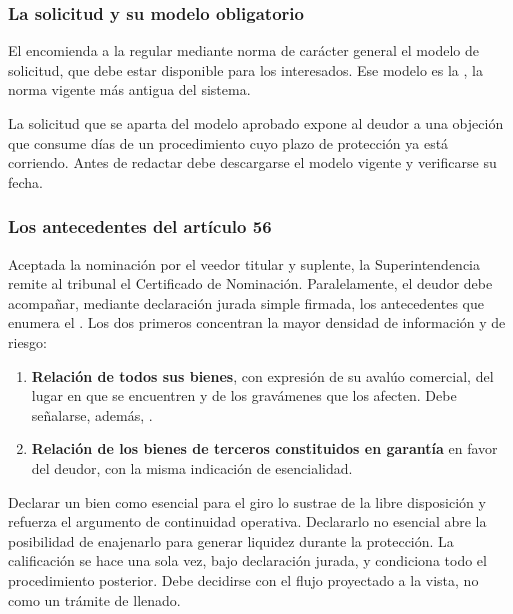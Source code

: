 \subsubsection{La solicitud y su modelo obligatorio}

El  encomienda a la \superir{} regular mediante norma de carácter general el modelo
de solicitud, que debe estar disponible para los interesados. Ese modelo es la 
\citeyearpar{ncg-4}, la norma vigente más antigua del sistema.

\begin{practica}
La solicitud que se aparta del modelo aprobado expone al deudor a una objeción que consume
días de un procedimiento cuyo plazo de protección ya está corriendo. Antes de redactar debe
descargarse el modelo vigente y verificarse su fecha.
\end{practica}

\subsubsection{Los antecedentes del artículo 56}

Aceptada la nominación por el veedor titular y suplente, la Superintendencia remite al
tribunal el Certificado de Nominación. Paralelamente, el deudor debe acompañar, mediante
declaración jurada simple firmada, los antecedentes que enumera el . Los dos
primeros concentran la mayor densidad de información y de riesgo:

\begin{enumerate}
  \item \textbf{Relación de todos sus bienes}, con expresión de su avalúo comercial, del
  lugar en que se encuentren y de los gravámenes que los afecten. Debe señalarse, además,
  .

  \item \textbf{Relación de los bienes de terceros constituidos en garantía} en favor del
  deudor, con la misma indicación de esencialidad.
\end{enumerate}

\begin{foco}
Declarar un bien como esencial para el giro lo sustrae de la libre disposición y refuerza el
argumento de continuidad operativa. Declararlo no esencial abre la posibilidad de enajenarlo
para generar liquidez durante la protección. La calificación se hace una sola vez, bajo
declaración jurada, y condiciona todo el procedimiento posterior. Debe decidirse con el
flujo proyectado a la vista, no como un trámite de llenado.
\end{foco}

